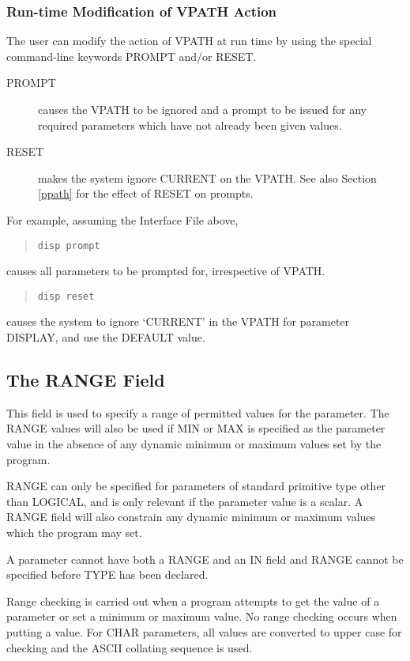 \documentclass[twoside,11pt]{article}
\newcommand{\xlabel}[1]{}
\renewcommand{\_}{\texttt{\symbol{95}}}
\begin{document}
\subsubsection*{Run-time Modification of VPATH Action}
The user can modify the action of VPATH at run time by using 
the special command-line keywords PROMPT and/or RESET.
\begin{description}
\item[PROMPT] causes the VPATH to be ignored and a prompt to be issued
for any required parameters which have not already been given values.
\item[RESET] makes the system ignore CURRENT on the VPATH.
See also Section \ref{ppath} for the effect of RESET on prompts.
\end{description}
For example, assuming the Interface File above,
\begin{quote} \begin{verbatim}
disp prompt
\end{verbatim} \end{quote}
causes all parameters to be prompted for, irrespective of VPATH.
\begin{quote} \begin{verbatim}
disp reset
\end{verbatim} \end{quote}
causes the system to ignore `CURRENT' in the VPATH for parameter DISPLAY,
and use the DEFAULT value.

\subsection{The RANGE Field
\xlabel{the_range_field}\label{range}}

This field is used to specify a range of permitted values for the parameter.
The RANGE values will also be used if MIN or MAX is specified as the parameter
value in the absence of any dynamic minimum or maximum values set by the
program.

RANGE can only be specified for parameters of standard primitive type other
than \_LOGICAL, and is only relevant if the parameter value is a scalar.
A RANGE field will also constrain any dynamic minimum or maximum values which
the program may set.

A parameter cannot have both a RANGE and an IN field and RANGE cannot be 
specified before TYPE has been declared. 

Range checking is carried out
when a program attempts to get the value of a parameter or set a minimum
or maximum value. No range checking occurs when putting a value. 
For \_CHAR parameters, all values are converted to upper case for checking and 
the ASCII collating sequence is used.
\end{document}

